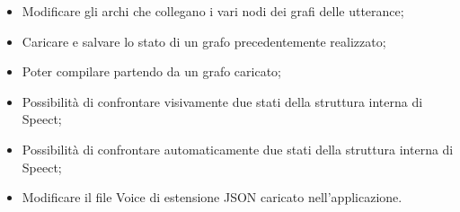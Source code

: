\documentclass[../AnalisideiRequisiti.tex]{subfiles}
\begin{document}
\begin{itemize}
\begin{itemize}
		\item{}	Modificare gli archi che collegano i vari nodi dei grafi delle utterance;
		\item{} Caricare e salvare lo stato di un grafo precedentemente realizzato;
		\item{} Poter compilare partendo da un grafo caricato;
		\item{}	Possibilità di confrontare visivamente due stati della struttura interna di Speect;
		\item{} Possibilità di confrontare automaticamente due stati della struttura interna di Speect;
		\item{} Modificare il file Voice di estensione JSON caricato nell'applicazione.
	\end{itemize}
	
\end{itemize}
\end{document}
